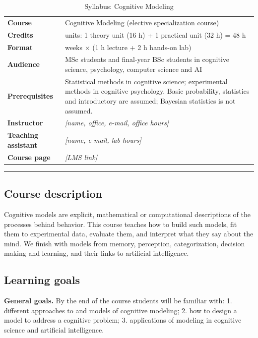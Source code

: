 \begin{longtable}[]{@{}
  >{\raggedright\arraybackslash}p{}
  >{\raggedright\arraybackslash}p{}@{}}
\caption{\centering Syllabus: Cognitive Modeling}\tabularnewline
\toprule\noalign{}
\endfirsthead
\endhead
\bottomrule\noalign{}
\endlastfoot
\textbf{Course} & Cognitive Modeling (elective specialization course) \\
\textbf{Credits} & 2 units: 1 theory unit (16 h) + 1 practical unit (32
h) = 48 h \\
\textbf{Format} & 16 weeks × (1 h lecture + 2 h hands-on lab) \\
\textbf{Audience} & MSc students and final-year BSc students in
cognitive science, psychology, computer science and AI \\
\textbf{Prerequisites} &
Statistical methods in cognitive science; experimental methods in cognitive psychology. Basic probability, statistics and introductory are assumed; Bayesian statistics is not assumed. \\
\textbf{Instructor} & \emph{{[}name, office, e-mail, office hours{]}} \\
\textbf{Teaching assistant} & \emph{{[}name, e-mail, lab hours{]}} \\
\textbf{Course page} & \emph{{[}LMS link{]}} \\
\end{longtable}

\begin{center}\rule{0.5\linewidth}{0.5pt}\end{center}

\subsection{Course description}

Cognitive models are explicit, mathematical or computational
descriptions of the processes behind behavior. This course teaches how
to build such models, fit them to experimental data, evaluate them, and
interpret what they say about the mind. We finish with models from
memory, perception, categorization, decision making and learning, and
their links to artificial intelligence.

\subsection{Learning goals}

\textbf{General goals.} By the end of the course students will be
familiar with: 1. different approaches to and models of cognitive
modeling; 2. how to design a model to address a cognitive problem; 3.
applications of modeling in cognitive science and artificial
intelligence.

